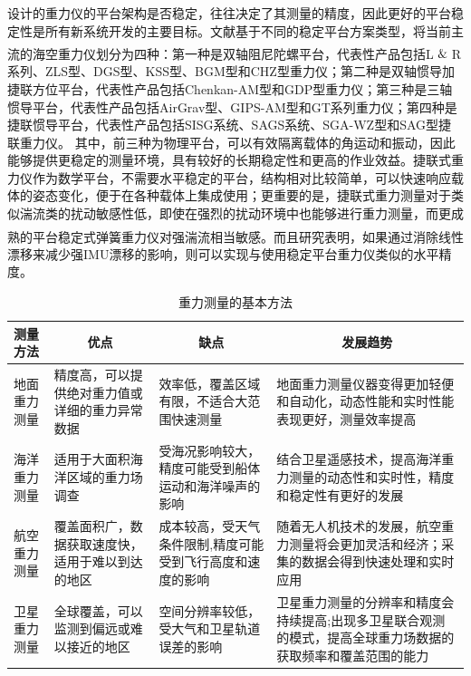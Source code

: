 \documentclass[12pt,a4,utf8]{article}
\newcommand{\upcite}[1]{\textsuperscript{\textsuperscript{\cite{#1}}}} %
\begin{document}
设计的重力仪的平台架构是否稳定，往往决定了其测量的精度，因此更好的平台稳定性是所有新系统开发的主要目标。文献\cite{huang2017development}基于不同的稳定平台方案类型，将当前主流的海空重力仪划分为四种\upcite{huang2017development,lacoste1967lacoste,Zongjie,Reviewon,Newlydeveloped,valliant2019lacoste}：第一种是双轴阻尼陀螺平台，代表性产品包括L$\And$R系列、ZLS型、DGS型、KSS型、BGM型和CHZ型重力仪；第二种是双轴惯导加捷联方位平台，代表性产品包括Chenkan-AM型和GDP型重力仪；第三种是三轴惯导平台，代表性产品包括AirGrav型、GIPS-AM型和GT系列重力仪；第四种是捷联惯导平台，代表性产品包括SISG系统、SAGS系统、SGA-WZ型和SAG型捷联重力仪。
其中，前三种为物理平台，可以有效隔离载体的角运动和振动，因此能够提供更稳定的测量环境，具有较好的长期稳定性和更高的作业效益。捷联式重力仪作为数学平台，不需要水平稳定的平台，结构相对比较简单，可以快速响应载体的姿态变化，便于在各种载体上集成使用；更重要的是，捷联式重力测量对于类似湍流类的扰动敏感性低，即使在强烈的扰动环境中也能够进行重力测量，而更成熟的平台稳定式弹簧重力仪对强湍流相当敏感\upcite{becker2016advanced}。而且研究表明\upcite{johann2019direct,wei1998flight,bastos2002gravity}，如果通过消除线性漂移来减少强IMU漂移的影响，则可以实现与使用稳定平台重力仪类似的水平精度。
\begin{table}[htbp]
      \centering
      \caption{重力测量的基本方法}
        \begin{tabular}{m{6.3em}<{\centering} m{7em}<{\centering} m{7.6em}<{\centering} m{10.125em}<{\centering}}
        \toprule
        \textbf{测量方法} & \multicolumn{1}{c}{\textbf{优点}} & \multicolumn{1}{c}{\textbf{缺点}} & \multicolumn{1}{c}{\textbf{发展趋势}} \\
        \midrule
        地面重力测量 & 精度高，可以提供绝对重力值或详细的重力异常数据 & 效率低，覆盖区域有限，不适合大范围快速测量 & 地面重力测量仪器变得更加轻便和自动化，动态性能和实时性能表现更好，测量效率提高 \\
        \midrule
        海洋重力测量 & 适用于大面积海洋区域的重力场调查 & 受海况影响较大，精度可能受到船体运动和海洋噪声的影响 & 结合卫星遥感技术，提高海洋重力测量的动态性和实时性，精度和稳定性有更好的发展 \\
        \midrule
        航空重力测量 & 覆盖面积广，数据获取速度快，适用于难以到达的地区 & 成本较高，受天气条件限制,精度可能受到飞行高度和速度的影响 & 随着无人机技术的发展，航空重力测量将会更加灵活和经济；\newline{}采集的数据会得到快速处理和实时应用 \\
        \midrule
        卫星重力测量 & 全球覆盖，可以监测到偏远或难以接近的地区 & 空间分辨率较低，受大气和卫星轨道误差的影响 & 卫星重力测量的分辨率和精度会持续提高;\newline{}出现多卫星联合观测的模式，提高全球重力场数据的获取频率和覆盖范围的能力 \\
        \bottomrule
        \end{tabular}%
      \label{tab_1}%
\end{table}%
\end{document}
